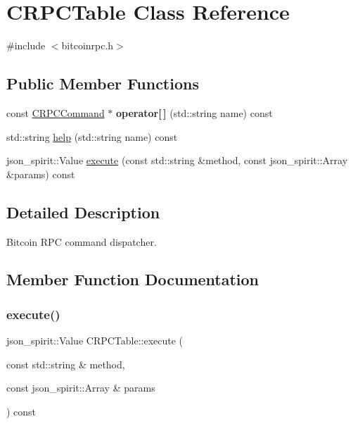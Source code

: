 \hypertarget{class_c_r_p_c_table}{}\section{C\+R\+P\+C\+Table Class Reference}
\label{class_c_r_p_c_table}


{\ttfamily \#include $<$bitcoinrpc.\+h$>$}

\subsection*{Public Member Functions}
\begin{DoxyCompactItemize}
\item 
\mbox{\label{class_c_r_p_c_table_a3d0faa5bfca42b473063981fa8d0fa75}} 
const \mbox{\hyperlink{class_c_r_p_c_command}{C\+R\+P\+C\+Command}} $\ast$ {\bfseries operator\mbox{[}$\,$\mbox{]}} (std\+::string name) const
\item 
std\+::string \mbox{\hyperlink{class_c_r_p_c_table_aaba3a5908a430d07084292d5a894c812}{help}} (std\+::string name) const
\item 
json\+\_\+spirit\+::\+Value \mbox{\hyperlink{class_c_r_p_c_table_a18a39759205e739d86a35a1c92243760}{execute}} (const std\+::string \&method, const json\+\_\+spirit\+::\+Array \&params) const
\end{DoxyCompactItemize}


\subsection{Detailed Description}
Bitcoin R\+PC command dispatcher. 

\subsection{Member Function Documentation}
\mbox{\label{class_c_r_p_c_table_a18a39759205e739d86a35a1c92243760}} 
\subsubsection{\texorpdfstring{execute()}{execute()}}
{\footnotesize\ttfamily json\+\_\+spirit\+::\+Value C\+R\+P\+C\+Table\+::execute (\begin{DoxyParamCaption}\item[{const std\+::string \&}]{method,  }\item[{const json\+\_\+spirit\+::\+Array \&}]{params }\end{DoxyParamCaption}) const}

